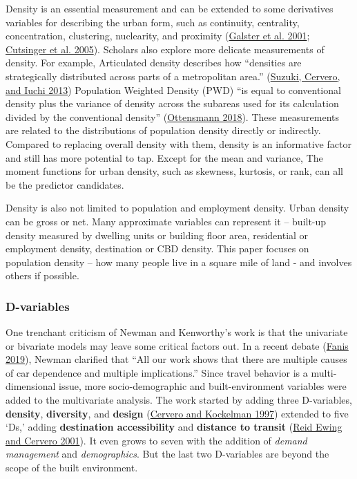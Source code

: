 \documentclass[
  12pt,
]{article}
\begin{document}
Density is an essential measurement and can be extended to some derivatives variables for describing the urban form, such as continuity, centrality, concentration, clustering, nuclearity, and proximity (\protect\hyperlink{ref-galsterWrestlingSprawlGround2001}{Galster et al. 2001}; \protect\hyperlink{ref-cutsingerVerifyingMultiDimensionalNature2005}{Cutsinger et al. 2005}). Scholars also explore more delicate measurements of density. For example, Articulated density describes how ``densities are strategically distributed across parts of a metropolitan area.'' (\protect\hyperlink{ref-suzukiTransformingCitiesTransit2013}{Suzuki, Cervero, and Iuchi 2013}) Population Weighted Density (PWD) ``is equal to conventional density plus the variance of density across the subareas used for its calculation divided by the conventional density'' (\protect\hyperlink{ref-ottensmannPopulationWeightedDensity2018}{Ottensmann 2018}). These measurements are related to the distributions of population density directly or indirectly. Compared to replacing overall density with them, density is an informative factor and still has more potential to tap. Except for the mean and variance, The moment functions for urban density, such as skewness, kurtosis, or rank, can all be the predictor candidates.

Density is also not limited to population and employment density. Urban density can be gross or net. Many approximate variables can represent it -- built-up density measured by dwelling units or building floor area, residential or employment density, destination or CBD density. This paper focuses on population density -- how many people live in a square mile of land - and involves others if possible.

\hypertarget{d-variables}{%
\subsubsection{D-variables}\label{d-variables}}

One trenchant criticism of Newman and Kenworthy's work is that the univariate or bivariate models may leave some critical factors out. In a recent debate (\protect\hyperlink{ref-fanisThreeStudiesThat2019}{Fanis 2019}), Newman clarified that ``All our work shows that there are multiple causes of car dependence and multiple implications.'' Since travel behavior is a multi-dimensional issue, more socio-demographic and built-environment variables were added to the multivariate analysis. The work started by adding three D-variables, \textbf{density}, \textbf{diversity}, and \textbf{design} (\protect\hyperlink{ref-cerveroTravelDemand3Ds1997}{Cervero and Kockelman 1997}) extended to five `Ds,' adding \textbf{destination accessibility} and \textbf{distance to transit} (\protect\hyperlink{ref-ewingTravelBuiltEnvironment2001}{Reid Ewing and Cervero 2001}). It even grows to seven with the addition of \emph{demand management} and \emph{demographics}. But the last two D-variables are beyond the scope of the built environment.
\end{document}
